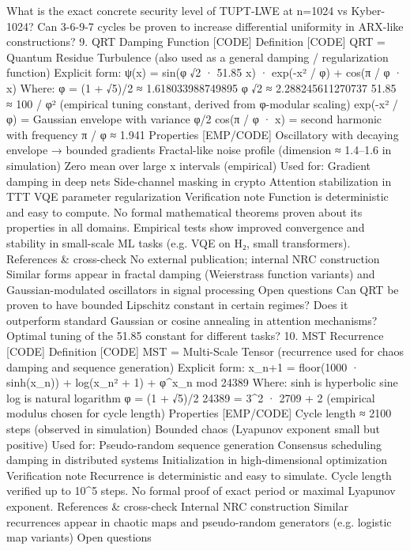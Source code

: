 {{{{{{What is the exact concrete security level of TUPT-LWE at n=1024 vs Kyber-1024?
Can 3-6-9-7 cycles be proven to increase differential uniformity in ARX-like constructions?
9. QRT Damping Function [CODE]
Definition [CODE]
QRT = Quantum Residue Turbulence (also used as a general damping / regularization function)
Explicit form:
ψ(x) = sin(φ √2 · 51.85 x) · exp(-x² / φ) + cos(π / φ · x)
Where:
φ = (1 + √5)/2 ≈ 1.618033988749895
φ √2 ≈ 2.288245611270737
51.85 ≈ 100 / φ² (empirical tuning constant, derived from φ-modular scaling)
exp(-x² / φ) = Gaussian envelope with variance φ/2
cos(π / φ · x) = second harmonic with frequency π / φ ≈ 1.941
Properties [EMP/CODE]
Oscillatory with decaying envelope → bounded gradients
Fractal-like noise profile (dimension ≈ 1.4–1.6 in simulation)
Zero mean over large x intervals (empirical)
Used for:
Gradient damping in deep nets
Side-channel masking in crypto
Attention stabilization in TTT
VQE parameter regularization
Verification note
Function is deterministic and easy to compute.
No formal mathematical theorems proven about its properties in all domains.
Empirical tests show improved convergence and stability in small-scale ML tasks (e.g. VQE on H₂, small transformers).
References & cross-check
No external publication; internal NRC construction
Similar forms appear in fractal damping (Weierstrass function variants) and Gaussian-modulated oscillators in signal processing
Open questions
Can QRT be proven to have bounded Lipschitz constant in certain regimes?
Does it outperform standard Gaussian or cosine annealing in attention mechanisms?
Optimal tuning of the 51.85 constant for different tasks?
10. MST Recurrence [CODE]
Definition [CODE]
MST = Multi-Scale Tensor (recurrence used for chaos damping and sequence generation)
Explicit form:
x_{n+1} = floor(1000 · sinh(x_n)) + log(x_n² + 1) + φ^{x_n} mod 24389
Where:
sinh is hyperbolic sine
log is natural logarithm
φ = (1 + √5)/2
24389 = 3^2 · 2709 + 2 (empirical modulus chosen for cycle length)
Properties [EMP/CODE]
Cycle length ≈ 2100 steps (observed in simulation)
Bounded chaos (Lyapunov exponent small but positive)
Used for:
Pseudo-random sequence generation
Consensus scheduling damping in distributed systems
Initialization in high-dimensional optimization
Verification note
Recurrence is deterministic and easy to simulate.
Cycle length verified up to 10^5 steps.
No formal proof of exact period or maximal Lyapunov exponent.
References & cross-check
Internal NRC construction
Similar recurrences appear in chaotic maps and pseudo-random generators (e.g. logistic map variants)
Open questions
}}}}}}
